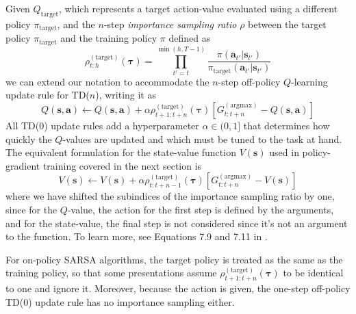 \documentclass{article}
\begin{document}
Given  $Q_\text{target}$, which represents a target action-value evaluated using a different policy $\pi_\text{target}$, and the $n$-step  \textit{importance sampling ratio} $\rho$ between the target policy $\pi_\text{target}$ and the training policy $\pi$ defined as \begin{equation}\rho^{(\text{target})}_{t:h}(\boldsymbol{\tau})=\prod_{t'=t}^{\min(h,T-1)}\frac{\pi(\mathbf{a}_{t'}|\mathbf{s}_{t'})}{\pi_\text{target}(\mathbf{a}_{t'}|\mathbf{s}_{t'})}\end{equation}
we can extend our notation to accommodate the $n$-step off-policy $Q$-learning update rule for TD($n$), writing it as
\begin{equation}\label{eq:n_step_q_learning_update}
Q(\mathbf{s},\mathbf{a})\leftarrow Q(\mathbf{s},\mathbf{a})+\alpha\rho^{(\text{target})}_{ t+1:t+n}(\boldsymbol{\tau})\left[G_{t:t+n}^{(\text{argmax})}-Q(\mathbf{s},\mathbf{a})\right]\end{equation}All TD(0) update rules add a hyperparameter $\alpha\in(0,1]$ that determines how quickly the $Q$-values are updated and which must be tuned to the task at hand. The equivalent formulation for the state-value function $V(\mathbf{s})$ used in policy-gradient training covered in the next section is 
\begin{equation}\label{eq:n_step_q_learning_update}
V(\mathbf{s})\leftarrow V(\mathbf{s})+\alpha\rho^{(\text{target})}_{ t:t+n-1}(\boldsymbol{\tau})\left[G_{t:t+n}^{(\text{argmax})}-V(\mathbf{s})\right]\end{equation}
where we have shifted the subindices of the importance sampling ratio by one, since for the $Q$-value, the action for the first step is defined by the arguments, and for the state-value, the final step is not considered since it's not an argument to the function. To learn more, see Equations 7.9 and 7.11 in \cite{sutton_barto_rl}.

For on-policy SARSA algorithms, the target policy is treated as the same as the training policy, so that some presentations assume $\rho^{(\text{target})}_{ t+1:t+n}(\boldsymbol{\tau})$ to be identical to one and ignore it. Moreover, because the action is given, the one-step off-policy TD(0) update rule has no importance sampling either. 
\end{document}
